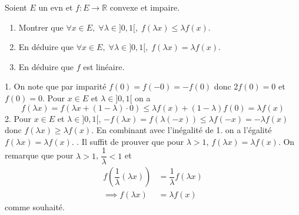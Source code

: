 \documentclass{fancybook}
\begin{document}
\begin{exercice}
Soient $E$ un evn et $f:E\to \mathbb R$ convexe et impaire.
\begin{enumerate}
\item Montrer que $\forall x\in E, \; \forall \lambda\in ]0,1[, \; f(\lambda x)\leq \lambda f(x)$.
\item En déduire que $\forall x\in E, \; \forall \lambda\in ]0,1[, \; f(\lambda x) = \lambda f(x)$.
\item En déduire que $f$ est linéaire.
\end{enumerate}
\end{exercice}
1. On note que par imparité $f(0)=f(-0)=-f(0)$ donc $2f(0)=0$ et $f(0)=0$.\newline 
Pour $x\in E$ et $\lambda\in ]0,1[$ on a $$f(\lambda x) =f(\lambda x + (1-\lambda)\cdot 0)\leq \lambda f(x) + (1-\lambda)f(0)=\lambda f(x)$$
2. Pour $x\in E$ et $\lambda\in ]0,1[$, $-f(\lambda x) = f(\lambda (-x)) \leq \lambda f(-x) = -\lambda f(x)$ donc $f(\lambda x)\geq \lambda f(x)$. En combinant avec l'inégalité de 1. on a l'égalité $f(\lambda x)= \lambda f(x)$. \newline {}. Il suffit de prouver que pour $\lambda >1$, $f(\lambda x)=\lambda f(x)$.\newline
On remarque que pour $\lambda >1$, $\dfrac 1 \lambda <1$ et $$\begin{aligned}
f(\dfrac 1 \lambda (\lambda x) ) &= \dfrac 1 \lambda f(\lambda x)\\
\implies f(\lambda x) &= \lambda f(x)
\end{aligned}$$
comme souhaité.
\end{document}
